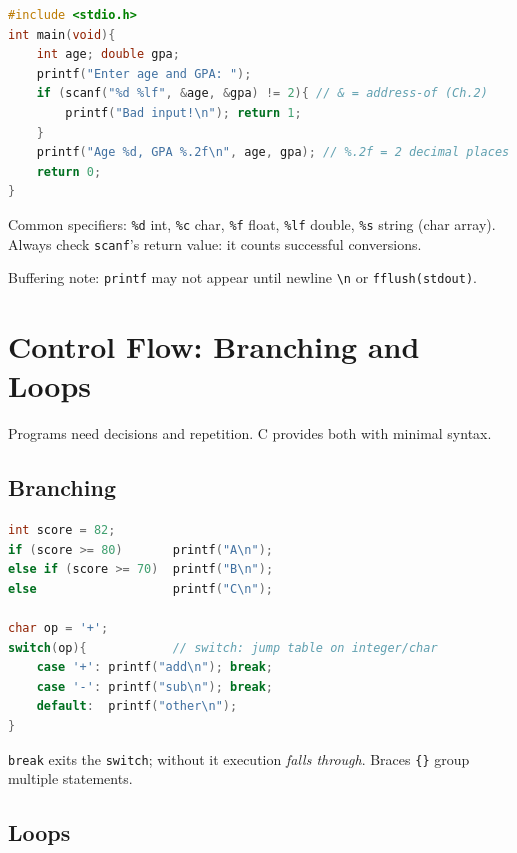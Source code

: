 \begin{lstlisting}[language=C]
#include <stdio.h>
int main(void){
    int age; double gpa;
    printf("Enter age and GPA: ");
    if (scanf("%d %lf", &age, &gpa) != 2){ // & = address-of (Ch.2)
        printf("Bad input!\n"); return 1;
    }
    printf("Age %d, GPA %.2f\n", age, gpa); // %.2f = 2 decimal places
    return 0;
}
\end{lstlisting}
Common specifiers: \texttt{\%d} int, \texttt{\%c} char, \texttt{\%f} float, \texttt{\%lf} double, \texttt{\%s} string (char array). Always check \texttt{scanf}'s return value: it counts successful conversions.

Buffering note: \texttt{printf} may not appear until newline \texttt{\textbackslash n} or \texttt{fflush(stdout)}.

\section{Control Flow: Branching and Loops}
\label{sec:control}
Programs need decisions and repetition. C provides both with minimal syntax.

\subsection{Branching}
\begin{lstlisting}[language=C]
int score = 82;
if (score >= 80)       printf("A\n");
else if (score >= 70)  printf("B\n");
else                   printf("C\n");

char op = '+';
switch(op){            // switch: jump table on integer/char
    case '+': printf("add\n"); break;
    case '-': printf("sub\n"); break;
    default:  printf("other\n");
}
\end{lstlisting}
\texttt{break} exits the \texttt{switch}; without it execution \emph{falls through}. Braces \texttt{\{\}} group multiple statements.

\subsection{Loops}

